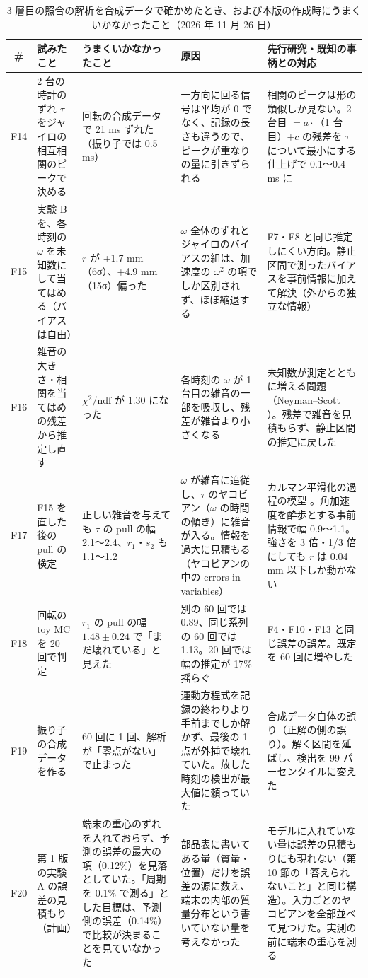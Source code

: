 \documentclass[paper=a4paper,fontsize=10pt,twocolumn,column_gap=2zw,line_length=24zw,number_of_lines=46,head_space=20mm]{jlreq}
\begin{document}
\begin{table}[t]\centering\footnotesize
\caption{3 層目の照合の解析を合成データで確かめたとき、および本版の作成時にうまくいかなかったこと（2026 年 11 月 26 日）}\label{tab:fail2}
\setlength{\tabcolsep}{3pt}
\begin{tabular}{cp{}p{}p{}p{}}\toprule
\# & 試みたこと & うまくいかなかったこと & 原因 & 先行研究・既知の事柄との対応 \\\midrule
F14 & 2 台の時計のずれ $\tau$ をジャイロの相互相関のピークで決める & 回転の合成データで 21 ms ずれた（振り子では 0.5 ms） & 一方向に回る信号は平均が 0 でなく、記録の長さも違うので、ピークが重なりの量に引きずられる & 相関のピークは形の類似しか見ない。2 台目 $= a\cdot$（1 台目）$+c$ の残差を $\tau$ について最小にする仕上げで 0.1〜0.4 ms に \\
F15 & 実験 B を、各時刻の $\omega$ を未知数にして当てはめる（バイアスは自由） & $r$ が +1.7 mm（6σ）、+4.9 mm（15σ）偏った & $\omega$ 全体のずれとジャイロのバイアスの組は、加速度の $\omega^2$ の項でしか区別されず、ほぼ縮退する & F7・F8 と同じ推定しにくい方向。静止区間で測ったバイアスを事前情報に加えて解決（外からの独立な情報） \\
F16 & 雑音の大きさ・相関を当てはめの残差から推定し直す & $\chi^2/\mathrm{ndf}$ が 1.30 になった & 各時刻の $\omega$ が 1 台目の雑音の一部を吸収し、残差が雑音より小さくなる & 未知数が測定とともに増える問題（Neyman--Scott \cite{neyman1948}）。残差で雑音を見積もらず、静止区間の推定に戻した \\
F17 & F15 を直した後の pull の検定 & 正しい雑音を与えても $\tau$ の pull の幅 2.1〜2.4、$r_1$・$s_2$ も 1.1〜1.2 & $\omega$ が雑音に追従し、$\tau$ のヤコビアン（$\omega$ の時間の傾き）に雑音が入る。情報を過大に見積もる（ヤコビアンの中の errors-in-variables） & カルマン平滑化の過程の模型 \cite{fruhwirth1987}。角加速度を酔歩とする事前情報で幅 0.9〜1.1。強さを 3 倍・1/3 倍にしても $r$ は 0.04 mm 以下しか動かない \\
F18 & 回転の toy MC を 20 回で判定 & $r_1$ の pull の幅 $1.48\pm0.24$ で「まだ壊れている」と見えた & 別の 60 回では 0.89、同じ系列の 60 回では 1.13。20 回では幅の推定が 17\% 揺らぐ & F4・F10・F13 と同じ誤差の誤差。既定を 60 回に増やした \\
F19 & 振り子の合成データを作る & 60 回に 1 回、解析が「零点がない」で止まった & 運動方程式を記録の終わりより手前までしか解かず、最後の 1 点が外挿で壊れていた。放した時刻の検出が最大値に頼っていた & 合成データ自体の誤り（正解の側の誤り）。解く区間を延ばし、検出を 99 パーセンタイルに変えた \\
F20 & 第 1 版の実験 A の誤差の見積もり（計画） & 端末の重心のずれを入れておらず、予測の誤差の最大の項（0.12\%）を見落としていた。「周期を 0.1\% で測る」とした目標は、予測側の誤差（0.14\%）で比較が決まることを見ていなかった & 部品表に書いてある量（質量・位置）だけを誤差の源に数え、端末の内部の質量分布という書いていない量を考えなかった & モデルに入れていない量は誤差の見積もりにも現れない（第 10 節の「答えられないこと」と同じ構造）。入力ごとのヤコビアンを全部並べて見つけた。実測の前に端末の重心を測る \\\bottomrule
\end{tabular}
\end{table}
\end{document}
